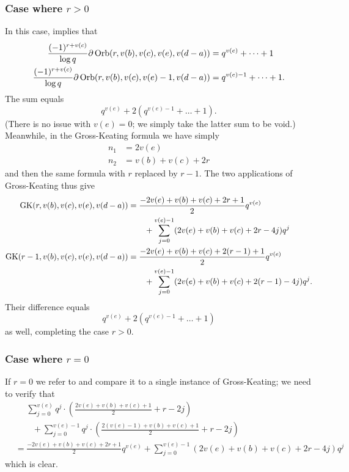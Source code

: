 \subsubsection{Case where $r > 0$}
In this case,  implies that
\begin{align*}
  \frac{(-1)^{r+v(c)}}{\log q}\partial\operatorname{Orb}(r, v(b), v(c), v(e), v(d-a))
  &= q^{v(e)} + \dots + 1 \\
  \frac{(-1)^{r+v(c)}}{\log q}\partial\operatorname{Orb}(r, v(b), v(c), v(e)-1, v(d-a))
  &= q^{v(e)-1} + \dots + 1.
\end{align*}
The sum equals
\[ q^{v(e)} + 2(q^{v(e)-1} + \dots + 1). \]
(There is no issue with $v(e) = 0$; we simply take the latter sum to be void.)
Meanwhile, in the Gross-Keating formula we have simply
\begin{align*}
  n_1 &= 2v(e) \\
  n_2 &= v(b) + v(c) + 2r
\end{align*}
and then the same formula with $r$ replaced by $r-1$.
The two applications of Gross-Keating thus give
\begin{align*}
  \operatorname{GK}(r, v(b), v(c), v(e), v(d-a))
  &= \frac{-2v(e)+v(b)+v(c)+2r+1}{2} q^{v(e)} \\
  &\qquad+ \sum_{j=0}^{v(e)-1} (2v(e)+v(b)+v(c)+2r-4j) q^j \\
  \operatorname{GK}(r-1, v(b), v(c), v(e), v(d-a))
  &= \frac{-2v(e)+v(b)+v(c)+2(r-1)+1}{2} q^{v(e)} \\
  &\qquad + \sum_{j=0}^{v(e)-1} (2v(e)+v(b)+v(c)+2(r-1)-4j) q^j.
\end{align*}
Their difference equals
\[ q^{v(e)} + 2(q^{v(e)-1} + \dots + 1) \]
as well, completing the case $r > 0$.

\subsubsection{Case where $r = 0$}
If $r = 0$ we refer to 
and compare it to a single instance of Gross-Keating; we need to verify that
\begin{align*}
  &\phantom= \sum_{j=0}^{v(e)} q^j \cdot \left( \frac{2v(e)+v(b)+v(c)+1}{2} + r - 2j \right) \\
  &\qquad+ \sum_{j=0}^{v(e)-1} q^j \cdot \left( \frac{2(v(e)-1)+v(b)+v(c)+1}{2} + r - 2j \right) \\
  &= \frac{-2v(e)+v(b)+v(c)+2r+1}{2} q^{v(e)}
  + \sum_{j=0}^{v(e)-1} (2v(e)+v(b)+v(c)+2r-4j) q^j
\end{align*}
which is clear.

